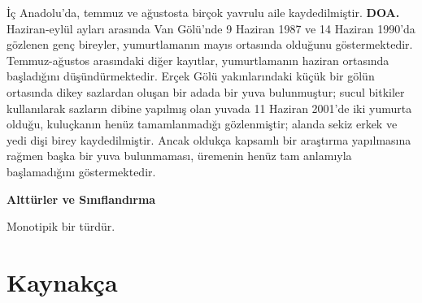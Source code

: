 \documentclass[
  a4paper,
  DIV=11,
  numbers=noendperiod]{scrartcl}
\begin{document}
İç Anadolu'da, temmuz ve ağustosta birçok yavrulu aile kaydedilmiştir.
\textbf{DOA.} Haziran-eylül ayları arasında Van Gölü'nde 9 Haziran 1987
ve 14 Haziran 1990'da gözlenen genç bireyler, yumurtlamanın mayıs
ortasında olduğunu göstermektedir. Temmuz-ağustos arasındaki diğer
kayıtlar, yumurtlamanın haziran ortasında başladığını düşündürmektedir.
Erçek Gölü yakınlarındaki küçük bir gölün ortasında dikey sazlardan
oluşan bir adada bir yuva bulunmuştur; sucul bitkiler kullanılarak
sazların dibine yapılmış olan yuvada 11 Haziran 2001'de iki yumurta
olduğu, kuluçkanın henüz tamamlanmadığı gözlenmiştir; alanda sekiz erkek
ve yedi dişi birey kaydedilmiştir. Ancak oldukça kapsamlı bir araştırma
yapılmasına rağmen başka bir yuva bulunmaması, üremenin henüz tam
anlamıyla başlamadığını göstermektedir.

\textbf{Alttürler ve Sınıflandırma}

Monotipik bir türdür.


\chapter*{Kaynakça}\label{kaynakuxe7a}

\end{document}
